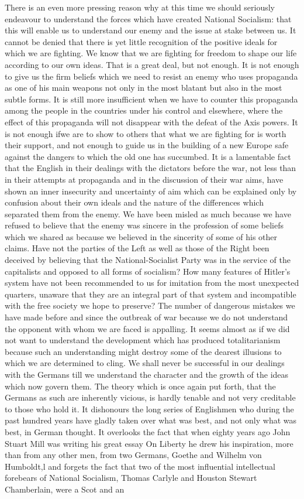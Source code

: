 \documentclass[11pt,openany]{book}
\begin{document}
There is an even more pressing reason why at this time we should seriously endeavour to understand the forces which have created National Socialism: that this will enable us to understand our enemy and the issue at stake between us. It cannot be denied that there is yet little recognition of the positive ideals for which we are fighting. We know that we are fighting for freedom to shape our life according to our own ideas. That is a great deal, but not enough. It is not enough to give us the firm beliefs which we need to resist an enemy who uses propaganda as one of his main weapons not only in the most blatant but also in the most subtle forms. It is still more insufficient when we have to counter this propaganda among the people in the countries under his control and elsewhere, where the effect of this propaganda will not disappear with the defeat of the Axis powers. It is not enough ifwe are to show to others that what we are fighting for is worth their support, and not enough to guide us in the building of a new Europe safe against the dangers to which the old one has succumbed. It is a lamentable fact that the English in their dealings with the dictators before the war, not less than in their attempts at propaganda and in the discussion of their war aims, have shown an inner insecurity and uncertainty of aim which can be explained only by confusion about their own ideals and the nature of the differences which separated them from the enemy. We have been misled as much because we have refused to believe that the enemy was sincere in the profession of some beliefs which we shared as because we believed in the sincerity of some of his other claims. Have not the parties of the Left as well as those of the Right been deceived by believing that the National-Socialist Party was in the service of the capitalists and opposed to all forms of socialism? How many features of Hitler's system have not been recommended to us for imitation from the most unexpected quarters, unaware that they are an integral part of that system and incompatible with the free society we hope to preserve? The number of dangerous mistakes we have made before and since the outbreak of war because we do not understand the opponent with whom we are faced is appalling. It seems almost as if we did not want to understand the development which has produced totalitarianism because such an understanding might destroy some of the dearest illusions to which we are determined to cling. We shall never be successful in our dealings with the Germans till we understand the character and the growth of the ideas which now govern them. The theory which is once again put forth, that the Germans as such are inherently vicious, is hardly tenable and not very creditable to those who hold it. It dishonours the long series of Englishmen who during the past hundred years have gladly taken over what was best, and not only what was best, in German thought. It overlooks the fact that when eighty years ago John Stuart Mill was writing his great essay On Liberty he drew his inspiration, more than from any other men, from two Germans, Goethe and Wilhelm von Humboldt,l and forgets the fact that two of the most influential intellectual forebears of National Socialism, Thomas Carlyle and Houston Stewart Chamberlain, were a Scot and an 
\end{document}
